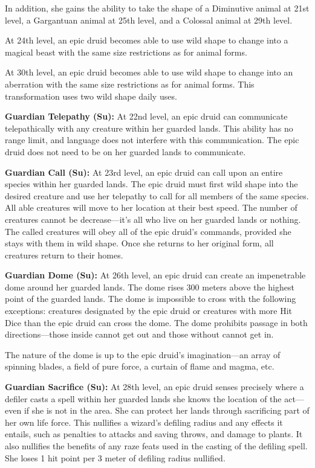 In addition, she gains the ability to take the shape of a Diminutive animal at 21st level, a Gargantuan animal at 25th level, and a Colossal animal at 29th level.

At 24th level, an epic druid becomes able to use wild shape to change into a magical beast with the same size restrictions as for animal forms.

At 30th level, an epic druid becomes able to use wild shape to change into an aberration with the same size restrictions as for animal forms. This transformation uses two wild shape daily uses.

\textbf{Guardian Telepathy (Su):} At 22nd level, an epic druid can communicate telepathically with any creature within her guarded lands. This ability has no range limit, and language does not interfere with this communication. The epic druid does not need to be on her guarded lands to communicate.

\textbf{Guardian Call (Su):} At 23rd level, an epic druid can call upon an entire species within her guarded lands. The epic druid must first wild shape into the desired creature and use her telepathy to call for all members of the same species. All able creatures will move to her location at their best speed. The number of creatures cannot be decrease---it's all who live on her guarded lands or nothing. The called creatures will obey all of the epic druid's commands, provided she stays with them in wild shape. Once she returns to her original form, all creatures return to their homes.

\textbf{Guardian Dome (Su):} At 26th level, an epic druid can create an impenetrable dome around her guarded lands. The dome rises 300 meters above the highest point of the guarded lands. The dome is impossible to cross with the following exceptions: creatures designated by the epic druid or creatures with more Hit Dice than the epic druid can cross the dome. The dome prohibits passage in both directions---those inside cannot get out and those without cannot get in.

The nature of the dome is up to the epic druid's imagination---an array of spinning blades, a field of pure force, a curtain of flame and magma, etc.

\textbf{Guardian Sacrifice (Su):} At 28th level, an epic druid senses precisely where a defiler casts a spell within her guarded lands she knows the location of the act---even if she is not in the area. She can protect her lands through sacrificing part of her own life force. This nullifies a wizard's defiling radius and any effects it entails, such as penalties to attacks and saving throws, and damage to plants. It also nullifies the benefits of any raze feats used in the casting of the defiling spell. She loses 1 hit point per 3 meter of defiling radius nullified.



